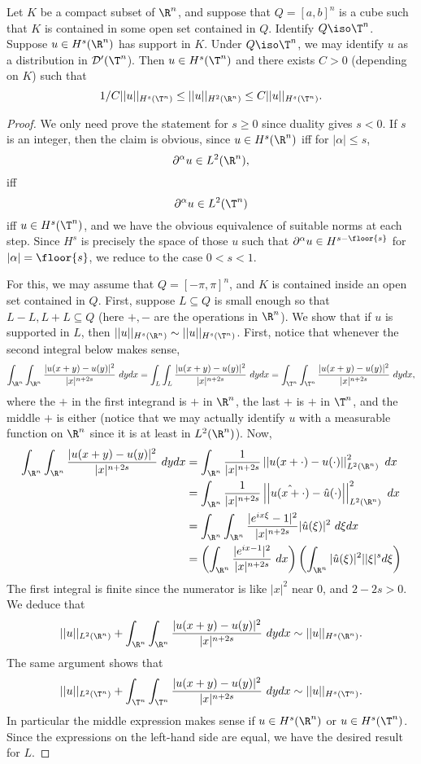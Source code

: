 \documentclass[12pt]{article}
\begin{document}
\setcounter{section}{1}
\begin{prop}Let $K$ be a compact subset of $\R^n$, and suppose that $Q = [a,b]^n$ is a cube such that $K$ is contained in some open set contained in $Q$. Identify $Q \iso \T^n$. Suppose $u \in H^s(\R^n)$ has support in $K$. Under $Q \iso \T^n$, we may identify $u$ as a distribution in $\mathcal D'(\T^n$). Then $u \in H^s(\T^n)$ and there exists $C > 0$ (depending on $K$) such that
\[1/C||u||_{H^s(\T^n)} \leq ||u||_{H^2(\R^n)} \leq C||u||_{H^s(\T^n)}.\]
\end{prop}
\begin{proof}
We only need prove the statement for $s \geq 0$ since duality gives $s < 0$. If $s$ is an integer, then the claim is obvious, since $u \in H^s(\R^n)$ iff for $|\alpha| \leq s$,
\[\partial^\alpha u \in L^2(\R^n),\]
iff
\[\partial^\alpha u \in L^2(\T^n)\]
iff $u \in H^s(\T^n)$, and we have the obvious equivalence of suitable norms at each step. Since $H^s$ is precisely the space of those $u$ such that $\partial^\alpha u \in H^{s-\floor{s}}$ for $|\alpha| = \floor{s}$, we reduce to the case $0 < s < 1$.

For this, we may assume that $Q = [-\pi,\pi]^n$, and $K$ is contained inside an open set contained in $Q$. First, suppose $L \subseteq Q$ is small enough so that $L-L, L+L \subseteq Q$ (here $+,-$ are the operations in $\R^n$). We show that if $u$ is supported in $L$, then $||u||_{H^s(\R^n)} \sim ||u||_{H^s(\T^n)}$. First, notice that whenever the second integral below makes sense,
\[\int_{\R^n}\int_{\R^n} \frac{|u(x+y)-u(y)|^2}{|x|^{n+2s}}\ dydx = \int_{L}\int_{L}\frac{|u(x+y)-u(y)|^2}{|x|^{n+2s}}\ dydx = \int_{\T^n}\int_{\T^n}\frac{|u(x+y)-u(y)|^2}{|x|^{n+2s}}\ dydx,\]
where the $+$ in the first integrand is $+$ in $\R^n$, the last $+$ is $+$ in $\T^n$, and the middle $+$ is either (notice that we may actually identify $u$ with a measurable function on $\R^n$ since it is at least in $L^2(\R^n)$). Now,
\begin{align*}
\int_{\R^n}\int_{\R^n} \frac{|u(x+y)-u(y)|^2}{|x|^{n+2s}}\ dydx &= \int_{\R^n}\frac{1}{|x|^{n+2s}}\left|\left|u(x+\cdot)-u(\cdot)\right|\right|^2_{L^2(\R^n)}\ dx\\
&= \int_{\R^n}\frac{1}{|x|^{n+2s}}\left|\left|\hat{u(x+\cdot)}-\hat{u}(\cdot)\right|\right|^2_{L^2(\R^n)}\ dx\\
&= \int_{\R^n}\int_{\R^n} \frac{|e^{ix\xi}-1|^2}{|x|^{n+2s}}|\hat{u}(\xi)|^2\ d\xi dx\\
&= \left(\int_{\R^n}\frac{|e^{ix-1}|^2}{|x|^{n+2s}}\ dx\right)\left(\int_{\R^n}|\hat{u}(\xi)|^2||\xi|^s d\xi\right)\end{align*}
The first integral is finite since the numerator is like $|x|^2$ near $0$, and $2-2s > 0$. We deduce that
\[||u||_{L^2(\R^n)} + \int_{\R^n}\int_{\R^n} \frac{|u(x+y)-u(y)|^2}{|x|^{n+2s}}\ dydx \sim ||u||_{H^s(\R^n)}.\] The same argument shows that
\[||u||_{L^2(\T^n)} + \int_{\T^n}\int_{\T^n}\frac{|u(x+y)-u(y)|^2}{|x|^{n+2s}}\ dydx \sim ||u||_{H^s(\T^n)}.\] In particular the middle expression makes sense if $u \in H^s(\R^n)$ or $u \in H^s(\T^n)$. Since the expressions on the left-hand side are equal, we have the desired result for $L$.


\end{proof}
\end{document}
